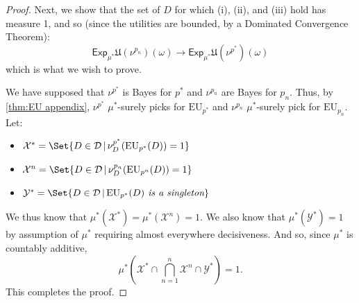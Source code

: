\documentclass[a4paper]{article}
\newcommand\X{\mathcal{X}}
\newcommand\Y{\mathcal{Y}}
\newcommand\D{\mathcal{D}}
\newcommand\Exp{\mathsf{Exp}}
\newcommand\EU{\mathrm{EU}}
\newcommand\U{\mathfrak{U}} %
\newcommand\SetDelimiter[1][]{
	\nonscript\,#1\vert \allowbreak \nonscript\,\mathopen{}}
\providecommand\given{\SetDelimiter}
\newenvironment{CCM rewritten}
{\begingroup\color{blue}} %
{\endgroup}              %
\begin{document}
\begin{proof}
Next, we show that the set of $D$ for which (i), (ii), and (iii) hold has measure 1, and so (since the utilities are bounded, by a Dominated Convergence Theorem):
$$\Exp_{\mu^*}\U(\nu^{p_n})(\omega) \longrightarrow \Exp_{\mu^*} \U(\nu^{p^*})(\omega)$$which is what we wish to prove.

We have supposed that $\nu^{p^*}$ is Bayes for $p^*$ and $\nu^{p_n}$ are Bayes for $p_n$. Thus, by \cref{thm:EU appendix}, $\nu^{p^*}$ ${\mu^*}$-surely picks for $\EU_{p^*}$
and $\nu^{p_n}$ ${\mu^*}$-surely pick for $\EU_{p_n}$. 
Let:
\begin{itemize}
	\item $\X^* = \Set{D \in \D \given \nu^{p^*}_D(\EU_{p^*}(D)) = 1 }$
	\item $\X^n = \Set{D \in \D \given \nu^{p_n}_D(\EU_{p^n}(D)) = 1 }$
	\item $\Y^* = \Set{D \in \D \given \EU_{p^*}(D) \textit{ is a singleton}}$
\end{itemize}
We thus know that ${\mu^*}(\X^*) = {\mu^*}(\X^n)=1$. We also know that ${\mu^*}(\Y^*) = 1$ by assumption of ${\mu^*}$ requiring almost everywhere decisiveness. And so, since ${\mu^*}$ is countably additive,
$${\mu^*}\left (\X^* \cap \bigcap^n_{n=1} \X^n \cap \Y^* \right ) = 1.$$This completes the proof.
\end{proof}
\end{document}
